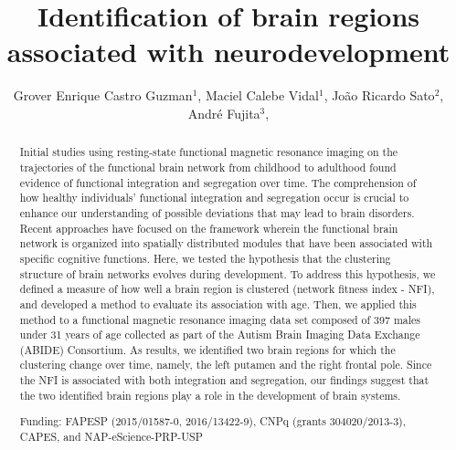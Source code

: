 \documentclass[twoside]{article}
\title{\vspace{-15mm}\fontsize{24pt}{10pt}\selectfont\textbf{ Identification of brain regions associated with neurodevelopment }} %
\author{ Grover Enrique Castro Guzman$^{1}$, Maciel Calebe Vidal$^{1}$, João Ricardo Sato$^{2}$, André Fujita$^{3}$, }
\affil{ 1 University of São Paulo

2 Universidade Federal do ABC

3 Institute of Mathematics and Statistics - USP

 }
\date{}
\begin{document}
  
  
  \maketitle %
  
  
  \thispagestyle{fancy} %
  
  
  \begin{abstract}
  Initial studies using resting-state functional magnetic resonance imaging on the trajectories of the functional brain network from childhood to adulthood found evidence of functional integration and segregation over time. The comprehension of how healthy individuals' functional integration and segregation occur is crucial to enhance our understanding of possible deviations that may lead to brain disorders. Recent approaches have focused on the framework wherein the functional brain network is organized into spatially distributed modules that have been associated with specific cognitive functions. Here, we tested the hypothesis that the clustering structure of brain networks evolves during development. To address this hypothesis, we defined a measure of how well a brain region is clustered (network fitness index - NFI), and developed a method to evaluate its association with age. Then, we applied this method to a functional magnetic resonance imaging data set composed of 397 males under 31 years of age collected as part of the Autism Brain Imaging Data Exchange (ABIDE) Consortium. As results, we identified two brain regions for which the clustering change over time, namely, the left putamen and the right frontal pole. Since the NFI is associated with both integration and segregation, our findings suggest that the two identified brain regions play a role in the development of brain systems.
  
  Funding: FAPESP (2015/01587-0, 2016/13422-9), CNPq (grants 304020/2013-3), CAPES, and NAP-eScience-PRP-USP \\ 
  \end{abstract}
  
\end{document}
